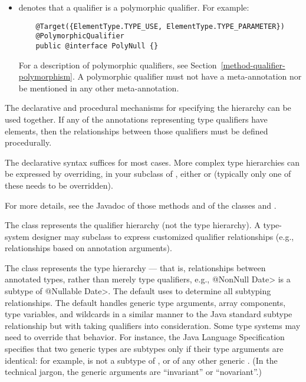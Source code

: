 \begin{itemize}
\item {} denotes that a qualifier is a
  polymorphic qualifier.  For example:

  \begin{Verbatim}
    @Target({ElementType.TYPE_USE, ElementType.TYPE_PARAMETER})
    @PolymorphicQualifier
    public @interface PolyNull {}
  \end{Verbatim}

  For a description of polymorphic qualifiers, see
  Section~\ref{method-qualifier-polymorphism}.  A polymorphic qualifier must not have
  a  meta-annotation nor be
  mentioned in any other 
  meta-annotation.

\end{itemize}

The declarative and procedural mechanisms for specifying the hierarchy can
be used together. If any of the annotations representing type qualifiers have elements, then
the relationships between those qualifiers must be defined procedurally.



The declarative syntax suffices for most cases.  More complex type
hierarchies can be expressed by overriding, in your subclass of
, either
or 
(typically only one of these needs to be overridden).

For more details, see the Javadoc of those methods and of the classes
 and .

The  class represents the qualifier hierarchy (not the
type hierarchy).  A type-system designer may subclass
 to express customized qualifier
relationships (e.g., relationships based on annotation
arguments).

The  class represents the type hierarchy ---
that is, relationships between
annotated types, rather than merely type qualifiers, e.g., \<@NonNull
Date> is a subtype of \<@Nullable Date>.  The default  uses
 to determine all subtyping relationships.
The default  handles
generic type arguments, array components, type variables, and
wildcards in a similar manner to the Java standard subtype
relationship but with taking qualifiers into consideration.  Some type
systems may need to override that behavior.  For instance, the Java
Language Specification specifies that two generic types are subtypes only
if their type arguments are identical:  for example,
 is not a subtype of , or of any other
generic .
(In the technical jargon, the generic arguments are ``invariant'' or ``novariant''.)


